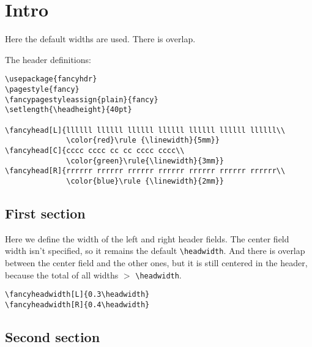 \documentclass[oneside]{report}
\begin{document}
\chapter{Intro}

\noindent\begin{boxedminipage}{\textwidth}
  Here the default widths are used. There is overlap.

  \medskip

The header definitions:
\begin{verbatim}
\usepackage{fancyhdr}
\pagestyle{fancy}
\fancypagestyleassign{plain}{fancy}
\setlength{\headheight}{40pt}

\fancyhead[L]{llllll llllll llllll llllll llllll llllll llllll\\
              \color{red}\rule {\linewidth}{5mm}}
\fancyhead[C]{cccc cccc cc cc cccc cccc\\
              \color{green}\rule{\linewidth}{3mm}}
\fancyhead[R]{rrrrrr rrrrrr rrrrrr rrrrrr rrrrrr rrrrrr rrrrrr\\
              \color{blue}\rule {\linewidth}{2mm}}
\end{verbatim}
\end{boxedminipage}
\bigskip

\newpage

\section{First section}

\noindent\begin{boxedminipage}{\textwidth}
  Here we define the width of the left and right header fields. The
  center field width isn't specified, so it remains the default
  \verb|\headwidth|. And there is overlap between the center field and
  the other ones, but it is still centered in the header, because the
  total of all widths $>$ \verb|\headwidth|.

\begin{verbatim}
\fancyheadwidth[L]{0.3\headwidth}
\fancyheadwidth[R]{0.4\headwidth}
\end{verbatim}
\end{boxedminipage}

\fancyheadwidth[L]{0.3\headwidth}
\fancyheadwidth[R]{0.4\headwidth}

\newpage

\section{Second section}
\end{document}
